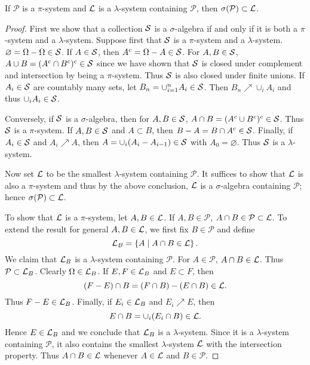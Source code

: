\begin{theorem}
    If $\mathcal{P}$ is a $\pi$-system and $\L$ is a $\lambda$-system
    containing $\mathcal{P}$, then $\sigma(\mathcal{P})\subset\L$.
\end{theorem}
\begin{proof}
    First we show that a collection $\S$ is a $\sigma$-algebra if and only if 
    it is both a $\pi$-system and a $\lambda$-system. Suppose first that $\S$ 
    is a $\pi$-system and a $\lambda$-system. $\varnothing = \Omega - \Omega\in\S$. 
    If $A\in\S$, then $A^c = \Omega - A\in\S$. For $A, B\in\S$, $A\cup B = (A^c\cap B^c)^c\in\S$
    since we have shown that $\S$ is closed under complement and intersection by 
    being a $\pi$-system. Thus $\S$ is also closed under finite unions. If 
    $A_i\in\S$ are countably many sets, let $B_n = \cup_{i=1}^n A_i\in\S$. Then 
    $B_n\nearrow \cup_i A_i$ and thus $\cup_i A_i\in\S$. 

    Conversely, if $\S$ is a $\sigma$-algebra, then for $A, B\in\S$, 
    $A\cap B = (A^c\cup B^c)^c\in\S$. Thus $\S$ is a $\pi$-system. 
    If $A, B\in\S$ and $A\subset B$, then $B - A = B\cap A^c\in\S$. 
    Finally, if $A_i\in\S$ and $A_i\nearrow A$, then $A = \cup_i (A_i - A_{i-1})\in\S$ 
    with $A_0 = \varnothing$. Thus $\S$ is a $\lambda$-system. 

    Now set $\L$ to be the smallest $\lambda$-system containing $\mathcal{P}$. 
    It suffices to show that $\L$ is also a $\pi$-system and thus by the above 
    conclusion, $\L$ is a $\sigma$-algebra containing $\mathcal{P}$; hence 
    $\sigma(\mathcal{P})\subset\L$. 

    To show that $\L$ is a $\pi$-system, let $A,B\in\L$. If $A, B\in\mathcal{P}$, 
    $A\cap B\in\mathcal{P}\subset\L$. To extend the result for general $A, B\in\L$, 
    we first fix $B\in\mathcal{P}$ and define 
    \begin{equation*}
        \L_B = \Set{A}{A\cap B\in\L}.
    \end{equation*}
    We claim that $\L_B$ is a $\lambda$-system containing $\mathcal{P}$. For 
    $A\in\mathcal{P}$, $A\cap B\in\L$. Thus $\mathcal{P}\subset\L_B$.
    Clearly $\Omega\in\L_B$. If $E,F\in\L_B$ and $E\subset F$, then
    \begin{equation*}
        (F-E)\cap B = (F\cap B) - (E\cap B)\in\L.  
    \end{equation*}
    Thus $F-E\in\L_B$. Finally, if $E_i\in\L_B$ and $E_i\nearrow E$, then
    \begin{equation*}
        E\cap B = \cup_i (E_i\cap B)\in\L.
    \end{equation*}
    Hence $E\in\L_B$ and we conclude that $\L_B$ is a $\lambda$-system. 
    Since it is a $\lambda$-system containing $\mathcal{P}$, it also contains 
    the smallest $\lambda$-system $\L$ with the intersection property. Thus 
    $A\cap B\in\L$ whenever $A\in\L$ and $B\in\mathcal{P}$. 


\end{proof}

